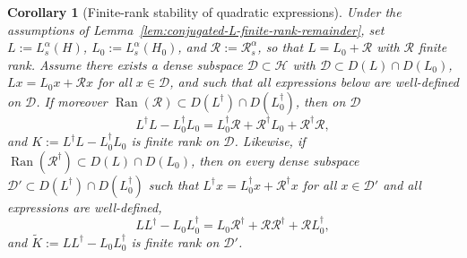 \documentclass[11pt]{amsart}
\newcommand{\1}{\mathbbm{1}}
\theoremstyle{plain}
\newtheorem{corollary}[theorem]{Corollary}
\theoremstyle{definition}
\theoremstyle{remark}
\numberwithin{equation}{section}
\begin{document}
\begin{corollary}[Finite-rank stability of quadratic expressions]
\label{cor:quadratic-finite-rank}
Under the assumptions of Lemma~\ref{lem:conjugated-L-finite-rank-remainder}, set \(L:=L_s^\alpha(H)\), \(L_0:=L_s^\alpha(H_0)\), and \(\mathcal R:=\mathcal R_s^\alpha\), so that \(L=L_0+\mathcal R\) with \(\mathcal R\) finite rank. Assume there exists a dense subspace \(\mathcal D\subset\mathcal H\) with \(\mathcal D\subset D(L)\cap D(L_0)\), \(Lx=L_0x+\mathcal R x\) for all \(x\in\mathcal D\), and such that all expressions below are well-defined on \(\mathcal D\). If moreover \(\operatorname{Ran}(\mathcal R)\subset D(L^\dagger)\cap D(L_0^\dagger)\), then on \(\mathcal D\)
\[
L^\dagger L-L_0^\dagger L_0=L_0^\dagger \mathcal R+\mathcal R^\dagger L_0+\mathcal R^\dagger \mathcal R,
\]
and \(K:=L^\dagger L-L_0^\dagger L_0\) is finite rank on \(\mathcal D\). Likewise, if \(\operatorname{Ran}(\mathcal R^\dagger)\subset D(L)\cap D(L_0)\), then on every dense subspace \(\mathcal D'\subset D(L^\dagger)\cap D(L_0^\dagger)\) such that \(L^\dagger x=L_0^\dagger x+\mathcal R^\dagger x\) for all \(x\in\mathcal D'\) and all expressions are well-defined,
\[
LL^\dagger-L_0L_0^\dagger=L_0\mathcal R^\dagger+\mathcal R\mathcal R^\dagger+\mathcal R L_0^\dagger,
\]
and \(\widetilde K:=LL^\dagger-L_0L_0^\dagger\) is finite rank on \(\mathcal D'\).
\end{corollary}
\end{document}
